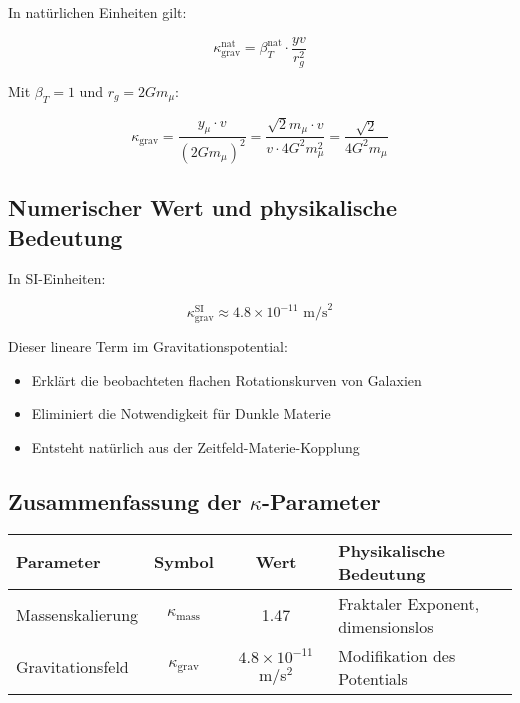 \documentclass[12pt,a4paper]{article}
\theoremstyle{definition}
\begin{document}
	In nat\"urlichen Einheiten gilt:
	
	\begin{equation}
		\kappa_{\text{grav}}^{\text{nat}} = \beta_T^{\text{nat}} \cdot \frac{yv}{r_g^2}
	\end{equation}
	
	Mit $\beta_T = 1$ und $r_g = 2Gm_\mu$:
	
	\begin{equation}
		\kappa_{\text{grav}} = \frac{y_\mu \cdot v}{(2Gm_\mu)^2} = \frac{\sqrt{2} m_\mu \cdot v}{v \cdot 4G^2m_\mu^2} = \frac{\sqrt{2}}{4G^2m_\mu}
	\end{equation}
	
	\subsection{Numerischer Wert und physikalische Bedeutung}
	
	In SI-Einheiten:
	
	\begin{equation}
		\kappa_{\text{grav}}^{\text{SI}} \approx 4.8 \times 10^{-11} \text{ m/s}^2
	\end{equation}
	
	Dieser lineare Term im Gravitationspotential:
	\begin{itemize}
		\item Erkl\"art die beobachteten flachen Rotationskurven von Galaxien
		\item Eliminiert die Notwendigkeit f\"ur Dunkle Materie
		\item Entsteht nat\"urlich aus der Zeitfeld-Materie-Kopplung
	\end{itemize}
	
	\subsection{Zusammenfassung der $\kappa$-Parameter}
	
	\begin{center}
		\begin{tabular}{|l|c|c|l|}
			\hline
			\textbf{Parameter} & \textbf{Symbol} & \textbf{Wert} & \textbf{Physikalische Bedeutung} \\
			\hline
			Massenskalierung & $\kappa_{\text{mass}}$ & 1.47 & Fraktaler Exponent, dimensionslos \\
			Gravitationsfeld & $\kappa_{\text{grav}}$ & $4.8 \times 10^{-11}$ m/s$^2$ & Modifikation des Potentials \\
			\hline
		\end{tabular}
	\end{center}
	
\end{document}
